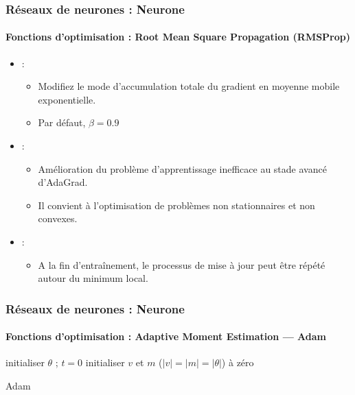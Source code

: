 \documentclass[xcolor=table]{beamer}
\begin{document}
\begin{frame}
\frametitle{Réseaux de neurones : Neurone}
\framesubtitle{Fonctions d'optimisation : Root Mean Square Propagation (RMSProp)}

\begin{itemize}
	\item {} : 
	\begin{itemize}
		\item Modifiez le mode d'accumulation totale du gradient en moyenne mobile exponentielle.
		\item Par défaut, $\beta = 0.9$ 
	\end{itemize}
	\item {} : 
	\begin{itemize}
		\item Amélioration du problème d'apprentissage inefficace au stade avancé d'AdaGrad. 
		\item Il convient à l'optimisation de problèmes non stationnaires et non convexes.
	\end{itemize}
	\item {} : 
	\begin{itemize}
		\item A la fin d'entraînement, le processus de mise à jour peut être répété autour du minimum local.
	\end{itemize}
\end{itemize}

\end{frame}

\begin{frame}
\frametitle{Réseaux de neurones : Neurone}
\framesubtitle{Fonctions d'optimisation : Adaptive Moment Estimation — Adam}

\begin{algorithm}[H]
	\KwResult{$ \theta $}
	initialiser $ \theta $ ; $ t = 0 $\;
	initialiser $v$ et $m$ ($|v| = |m| = |\theta|$) à zéro\;
	\caption{Adam \cite{2015-kingma-ba}}
\end{algorithm}

\end{frame}
\end{document}
